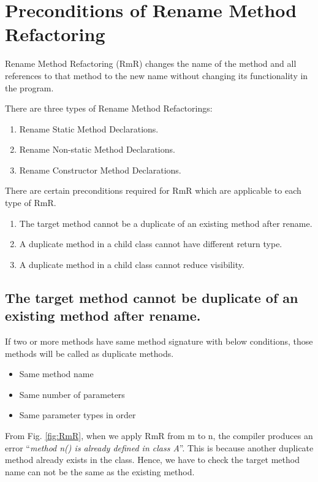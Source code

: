 \section{\textbf{Preconditions of Rename Method Refactoring}}

Rename Method Refactoring (RmR) changes the name of the method and all references to that method to the new name without changing its functionality in the program.

There are three types of Rename Method Refactorings:
\begin{enumerate}
\item Rename Static Method Declarations.
\item Rename Non-static Method Declarations.
\item Rename Constructor Method Declarations.
\end{enumerate}

There are certain preconditions required for RmR which are applicable to each type of RmR.
\begin{enumerate}
	\item The target method cannot be a duplicate of an existing method after rename.
	\item A duplicate method in a child class cannot have different return type.
	\item A duplicate method in a child class cannot reduce visibility.
\end{enumerate}

\subsection {The target method cannot be duplicate of an existing method after rename. }

If two or more methods have same method signature with
below conditions, those methods will be called as duplicate
methods.
\begin{itemize}
	\item Same method name
	\item Same number of parameters
	\item Same parameter types in order
\end{itemize}

From Fig. \ref{fig:RmR}, when we apply RmR from m to n, the compiler produces an error ``\textsl{method n() is already defined in class A}''. This is because another duplicate method already exists in the class. Hence, we have to check the target method name can not be the same as the existing method.

